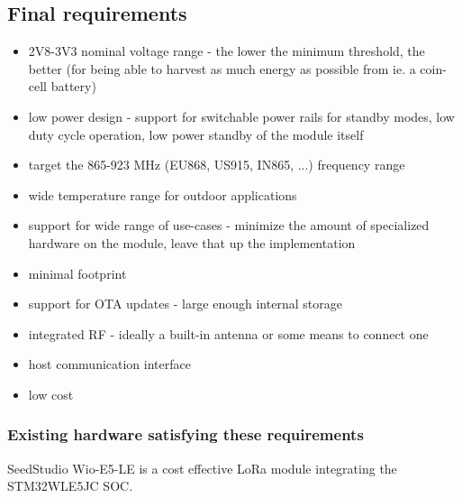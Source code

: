 \subsection{\label{section:final-requirements} Final requirements}
\begin{itemize}
    \item 2V8-3V3 nominal voltage range - the lower the minimum threshold, the better (for being able to harvest as much energy as possible from ie. a coin-cell battery)
    \item low power design - support for switchable power rails for standby modes, low duty cycle operation, low power standby of the module itself
    \item target the 865-923 MHz (EU868, US915, IN865, ...) frequency range
    \item wide temperature range for outdoor applications
    \item support for wide range of use-cases - minimize the amount of specialized hardware on the module, leave that up the implementation
    \item minimal footprint
    \item support for OTA updates - large enough internal storage
    \item integrated RF - ideally a built-in antenna or some means to connect one
    \item host communication interface
    \item low cost
\end{itemize}

\subsubsection{Existing hardware satisfying these requirements}

SeedStudio Wio-E5-LE \cite{stmicroelectronics_lora_2024, seeedstudio_wio-e5-wireless_2024} is a cost effective LoRa module integrating the STM32WLE5JC SOC.


